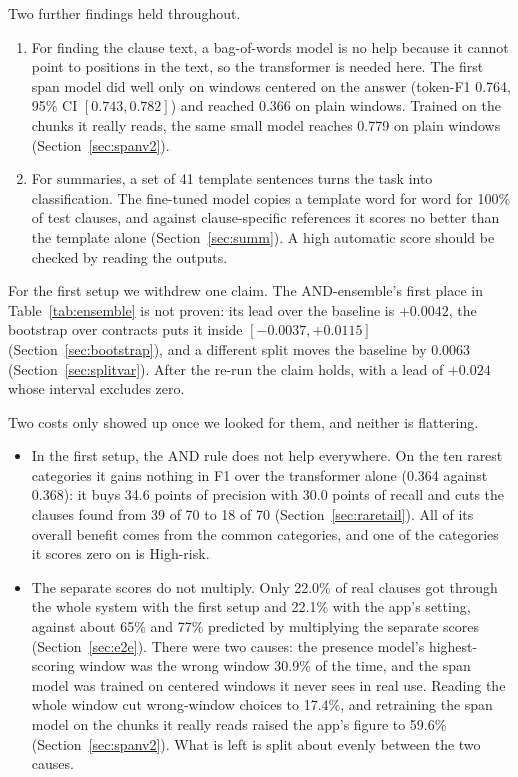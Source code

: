 Two further findings held throughout.
\begin{enumerate}[itemsep=2pt]
  \item For finding the clause text, a bag-of-words model is no help because it cannot point to positions in the text, so the transformer is needed here. The first span model did well only on windows centered on the answer (token-F1 0.764, 95\% CI $[0.743, 0.782]$) and reached 0.366 on plain windows. Trained on the chunks it really reads, the same small model reaches 0.779 on plain windows (Section~\ref{sec:spanv2}).
  \item For summaries, a set of 41 template sentences turns the task into classification. The fine-tuned model copies a template word for word for 100\% of test clauses, and against clause-specific references it scores no better than the template alone (Section~\ref{sec:summ}). A high automatic score should be checked by reading the outputs.
\end{enumerate}

For the first setup we withdrew one claim. The AND-ensemble's first place in Table~\ref{tab:ensemble} is not proven: its lead over the baseline is $+0.0042$, the bootstrap over contracts puts it inside $[-0.0037, +0.0115]$ (Section~\ref{sec:bootstrap}), and a different split moves the baseline by $0.0063$ (Section~\ref{sec:splitvar}). After the re-run the claim holds, with a lead of $+0.024$ whose interval excludes zero.

Two costs only showed up once we looked for them, and neither is flattering.
\begin{itemize}[itemsep=2pt]
  \item In the first setup, the AND rule does not help everywhere. On the ten rarest categories it gains nothing in F1 over the transformer alone (0.364 against 0.368): it buys 34.6 points of precision with 30.0 points of recall and cuts the clauses found from 39 of 70 to 18 of 70 (Section~\ref{sec:raretail}). All of its overall benefit comes from the common categories, and one of the categories it scores zero on is High-risk.
  \item The separate scores do not multiply. Only 22.0\% of real clauses got through the whole system with the first setup and 22.1\% with the app's setting, against about 65\% and 77\% predicted by multiplying the separate scores (Section~\ref{sec:e2e}). There were two causes: the presence model's highest-scoring window was the wrong window 30.9\% of the time, and the span model was trained on centered windows it never sees in real use. Reading the whole window cut wrong-window choices to 17.4\%, and retraining the span model on the chunks it really reads raised the app's figure to 59.6\% (Section~\ref{sec:spanv2}). What is left is split about evenly between the two causes.
\end{itemize}

